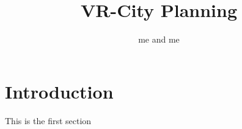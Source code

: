 \documentclass{article}
\title{VR-City Planning}
\author{me and me}
\begin{document}
\maketitle

\section{Introduction}
This is the first section
\end{document}
